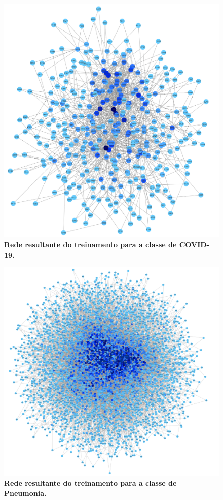 \documentclass[
12pt,        %
oneside,     %
a4paper,     %
english,       %
brazil        %
%
%
]{ppgca}
\begin{document}
\begin{figure}[H]
    \includegraphics[width=\textwidth]{rede0.png}
    \centering
    \caption{\textbf{Rede resultante do treinamento para a classe de COVID-19.}}
    \label{fig:rede0}
\end{figure}

\begin{figure}[H]
    \includegraphics[width=\textwidth]{redereduzida1.png}
    \centering
    \caption{\textbf{Rede resultante do treinamento para a classe de Pneumonia.}}
    \label{fig:redereduzida1}
\end{figure}
\end{document}
